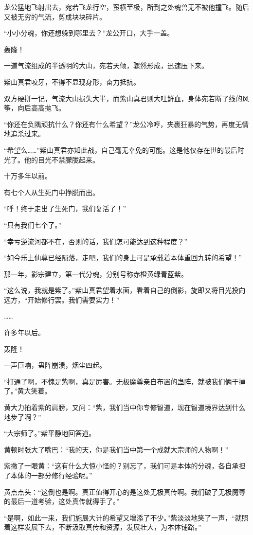 \begin{this_body}
龙公猛地飞射出去，宛若飞龙行空，蛮横至极，所到之处魂兽无不被他撞飞。随后又被无穷的气流，剪成块块碎片。

“小小分魂，你还想躲到哪里去？”龙公开口，大手一盖。

轰隆！

一道气流组成的半透明的大山，宛若天倾，骤然形成，迅速压下来。

紫山真君咬牙，不得不显现身形，奋力抵抗。

双方硬拼一记，气流大山损失大半，而紫山真君则大吐鲜血，身体宛若断了线的风筝，向后高高抛飞。

“你还在负隅顽抗什么？你还有什么希望？”龙公冷哼，夹裹狂暴的气势，再度无情地追杀过来。

“希望么……”紫山真君亦知此战，自己毫无幸免的可能。这是他仅存在世的最后时光了。他的目光不禁朦胧起来。

十万多年以前。

有七个人从生死门中挣脱而出。

“呼！终于走出了生死门，我们复活了！”

“只有我们七个了。”

“幸亏逆流河都不在，否则的话，我们怎可能达到这种程度？”

“如今乐土仙尊已经陨落，走吧，我们的身上可是承载着本体重回九转的希望！”

那一年，影宗建立，第一代分魂，分别号称赤橙黄绿青蓝紫。

“这么说，我就是紫了。”紫山真君望着水面，看着自己的倒影，旋即又将目光投向远方，“开始修行罢。我们需要实力！”

……

许多年以后。

轰隆！

一声巨响，蛊阵崩溃，烟尘四起。

“打通了啊，不愧是紫啊，真是厉害。无极魔尊亲自布置的蛊阵，就被我们俩干掉了。”黄大笑着。

黄大力拍着紫的肩膀，又问：“紫，我们当中你专修智道，现在智道境界达到什么地步了啊？”

“大宗师了。”紫平静地回答道。

黄顿时张大了嘴巴：“我的天，你是我们当中第一个成就大宗师的人物啊！”

紫撇了一眼黄：“这有什么大惊小怪的？别忘了，我们可是本体的分魂，各自承担了本体的一部分修行经验呢。”

黄点点头：“这倒也是啊。真正值得开心的是这处无极真传啊。我们破了无极魔尊的最后一道考验，这处真传就得手了。”

“是啊，如此一来，我们施展大计的希望又增添了不少。”紫淡淡地笑了一声，“就照着这样发展下去，不断汲取真传和资源，发展壮大，为本体铺路。”


\end{this_body}
